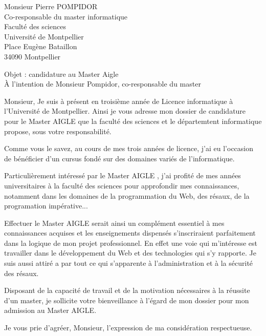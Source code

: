 \documentclass[12pt]{lettre}
\begin{document}
\begin{letter}{Monsieur Pierre POMPIDOR \\ Co-responsable du master informatique \\ Faculté des sciences \\ Université de Montpellier \\
Place Eugène Bataillon \\ 34090 Montpellier}
   \date{Jeudi 9 février 2017}                       
   \nolieu{}                       
   \address{75 Avenue Augustin Fliche \\ 34090 Montpellier}
   \notelephone{} 
   \nofax{}             
   \opening{ Objet : candidature au Master Aigle \\ À l'intention de Monsieur Pompidor, co-responsable du master }
   
   \begin{small}
   Monsieur,
   Je suis à présent en troisième année de Licence informatique à l’Université de Montpellier. Ainsi je vous adresse mon dossier de candidature pour le Master AIGLE que la faculté des sciences et le départemtent informatique propose, sous votre responsabilité.

Comme vous le savez, au cours de mes trois années de licence, j’ai eu l’occasion de bénéficier d’un cursus fondé sur des domaines variés de l'informatique.

Particulièrement intéressé par le Master AIGLE , j’ai profité de mes années universitaires à la faculté des sciences pour approfondir mes connaissances, notamment dans les domaines de la programmation du Web, des résaux, de la programation impérative...

Effectuer le Master AIGLE serait ainsi un complément essentiel à mes connaissances acquises et les enseignements dispensés s’inscriraient parfaitement dans la logique de mon projet professionnel. En effet une voie qui m'intéresse est travailler dans le développement du Web et des technologies qui s'y rapporte. Je suis aussi attiré a par tout ce qui s'apparente à l'administration et à la sécurité des résaux.

Disposant de la capacité de travail et de la motivation nécessaires à la réussite d’un master, je sollicite votre bienveillance à l’égard de mon dossier pour mon admission au Master AIGLE.
   \end{small}
  
   \closing{Je vous prie d’agréer, Monsieur, l’expression de ma considération respectueuse.}
\end{letter}
\end{document}
